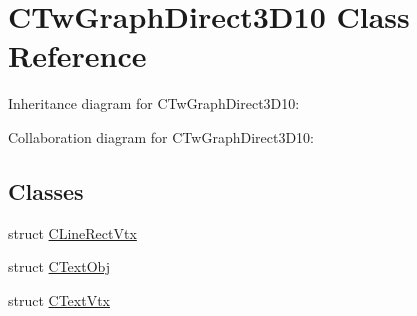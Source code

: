 \hypertarget{class_c_tw_graph_direct3_d10}{\section{C\+Tw\+Graph\+Direct3\+D10 Class Reference}
\label{class_c_tw_graph_direct3_d10}
}


Inheritance diagram for C\+Tw\+Graph\+Direct3\+D10\+:


Collaboration diagram for C\+Tw\+Graph\+Direct3\+D10\+:
\subsection*{Classes}
\begin{DoxyCompactItemize}
\item 
struct \hyperlink{struct_c_tw_graph_direct3_d10_1_1_c_line_rect_vtx}{C\+Line\+Rect\+Vtx}
\item 
struct \hyperlink{struct_c_tw_graph_direct3_d10_1_1_c_text_obj}{C\+Text\+Obj}
\item 
struct \hyperlink{struct_c_tw_graph_direct3_d10_1_1_c_text_vtx}{C\+Text\+Vtx}
\end{DoxyCompactItemize}
